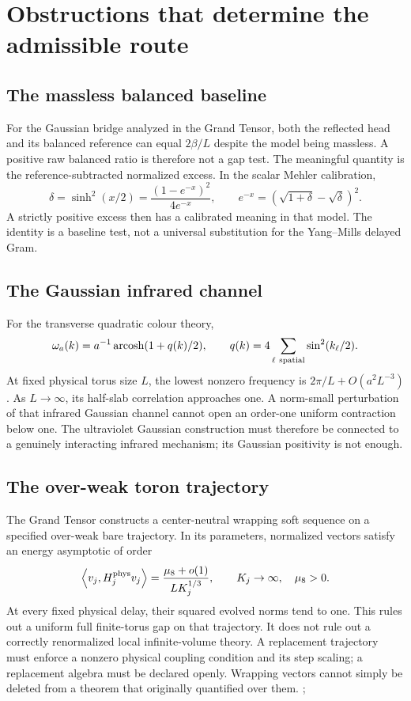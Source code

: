 \documentclass[11pt,oneside,openany]{book}
\theoremstyle{definition}
\theoremstyle{remark}
\newcommand{\ip}[2]{\left\langle#1,#2\right\rangle}
\newcommand{\src}[2]{\cite[#2]{#1}}
\begin{document}
\section{Obstructions that determine the admissible route}
\subsection{The massless balanced baseline}
For the Gaussian bridge analyzed in the Grand Tensor, both the reflected head and its balanced reference can equal $2\beta/L$ despite the model being massless. A positive raw balanced ratio is therefore not a gap test. The meaningful quantity is the reference-subtracted normalized excess. In the scalar Mehler calibration,
\[
\delta=\sinh^2(x/2)=\frac{(1-e^{-x})^2}{4e^{-x}},
\qquad
e^{-x}=(\sqrt{1+\delta}-\sqrt\delta)^2.
\]
A strictly positive excess then has a calibrated meaning in that model. The identity is a baseline test, not a universal substitution for the Yang--Mills delayed Gram. \cite{GT}

\subsection{The Gaussian infrared channel}
For the transverse quadratic colour theory,
\[
\omega_a(k)=a^{-1}\operatorname{arcosh}(1+q(k)/2),\qquad
q(k)=4\sum_{\ell\ {\rm spatial}}\sin^2(k_\ell/2).
\]
At fixed physical torus size $L$, the lowest nonzero frequency is $2\pi/L+O(a^2L^{-3})$. As $L\to\infty$, its half-slab correlation approaches one. A norm-small perturbation of that infrared Gaussian channel cannot open an order-one uniform contraction below one. The ultraviolet Gaussian construction must therefore be connected to a genuinely interacting infrared mechanism; its Gaussian positivity is not enough. \cite{GT}

\subsection{The over-weak toron trajectory}
The Grand Tensor constructs a center-neutral wrapping soft sequence on a specified over-weak bare trajectory. In its parameters, normalized vectors satisfy an energy asymptotic of order
\[
\ip{v_j}{H_j^{\rm phys}v_j}
=\frac{\mu_8+o(1)}{LK_j^{1/3}},\qquad K_j\to\infty,\quad\mu_8>0.
\]
At every fixed physical delay, their squared evolved norms tend to one. This rules out a uniform full finite-torus gap on that trajectory. It does not rule out a correctly renormalized local infinite-volume theory. A replacement trajectory must enforce a nonzero physical coupling condition and its step scaling; a replacement algebra must be declared openly. Wrapping vectors cannot simply be deleted from a theorem that originally quantified over them. \cite{GT}; \src{F1}{V1}
\end{document}
